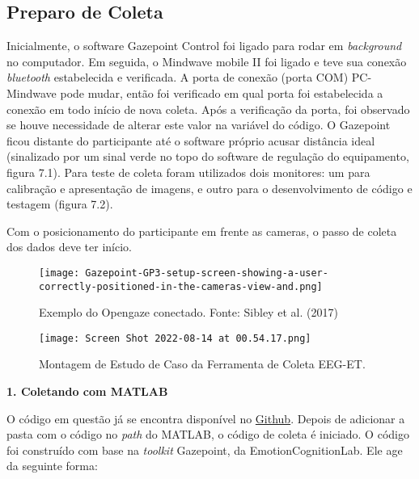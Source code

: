 \subsection{Preparo de Coleta}
Inicialmente, o software Gazepoint Control foi ligado para rodar em  \textit{background} no computador. 
Em seguida, o Mindwave mobile II foi ligado e teve sua conexão \textit{bluetooth} estabelecida e 
verificada. A porta de conexão (porta COM) PC-Mindwave pode mudar, 
então foi verificado em qual porta foi estabelecida a conexão 
em todo início de nova coleta. Após a verificação da porta, foi 
observado se houve necessidade de alterar
este valor na variável do código. O Gazepoint ficou distante do participante até o
software próprio acusar distância ideal (sinalizado por um sinal verde no topo do 
software de regulação do equipamento, figura 7.1).
Para teste de coleta foram utilizados dois monitores: um para calibração e apresentação de imagens,
e outro para o desenvolvimento de código e testagem (figura 7.2). 

Com o posicionamento do participante em frente as cameras, o passo de coleta dos dados deve ter início. 

\begin{figure}[!h]
    \texttt{[image: Gazepoint-GP3-setup-screen-showing-a-user-correctly-positioned-in-the-cameras-view-and.png]}
    \caption{Exemplo do Opengaze conectado. Fonte: Sibley et al. (2017)}
\end{figure}



\begin{figure}
    \centering
    \texttt{[image: Screen Shot 2022-08-14 at 00.54.17.png]}
    \caption{Montagem de Estudo de Caso da Ferramenta de Coleta EEG-ET.}
\end{figure}







\textbf{1. Coletando com MATLAB}

O código em questão já se encontra disponível no \href{https://github.com/anapaulasandes/ppgeb_masters}{Github}.
Depois de adicionar a pasta com o código no \textit{path} do MATLAB, o código de coleta é
iniciado. O código foi construído com base na \textit{toolkit} Gazepoint, da EmotionCognitionLab. 
Ele age da seguinte forma:

